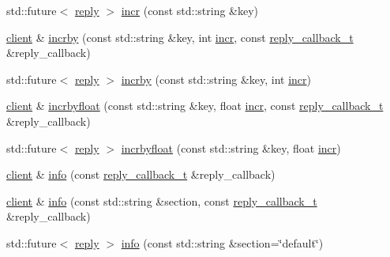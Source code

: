 \begin{DoxyCompactItemize}
\item 
std\+::future$<$ \hyperlink{classcpp__redis_1_1reply}{reply} $>$ \hyperlink{classcpp__redis_1_1client_a36ce71119f98cdc29fb29ca33c8b1ff1}{incr} (const std\+::string \&key)
\item 
\hyperlink{classcpp__redis_1_1client}{client} \& \hyperlink{classcpp__redis_1_1client_a7ee625ebbbfc9fb6f9821b94055e0a5c}{incrby} (const std\+::string \&key, int \hyperlink{classcpp__redis_1_1client_a2f9ba6c7e83451207403096b19da4faa}{incr}, const \hyperlink{classcpp__redis_1_1client_a061a1140d36d2eaeda82b09a0bb3f9f2}{reply\+\_\+callback\+\_\+t} \&reply\+\_\+callback)
\item 
std\+::future$<$ \hyperlink{classcpp__redis_1_1reply}{reply} $>$ \hyperlink{classcpp__redis_1_1client_ab7dbabc00708da38938bb461b195f177}{incrby} (const std\+::string \&key, int \hyperlink{classcpp__redis_1_1client_a2f9ba6c7e83451207403096b19da4faa}{incr})
\item 
\hyperlink{classcpp__redis_1_1client}{client} \& \hyperlink{classcpp__redis_1_1client_a3ae6ca0b7896748a8fe5a450550c422e}{incrbyfloat} (const std\+::string \&key, float \hyperlink{classcpp__redis_1_1client_a2f9ba6c7e83451207403096b19da4faa}{incr}, const \hyperlink{classcpp__redis_1_1client_a061a1140d36d2eaeda82b09a0bb3f9f2}{reply\+\_\+callback\+\_\+t} \&reply\+\_\+callback)
\item 
std\+::future$<$ \hyperlink{classcpp__redis_1_1reply}{reply} $>$ \hyperlink{classcpp__redis_1_1client_a32c78234437f7f02492e3e01dd44bc43}{incrbyfloat} (const std\+::string \&key, float \hyperlink{classcpp__redis_1_1client_a2f9ba6c7e83451207403096b19da4faa}{incr})
\item 
\hyperlink{classcpp__redis_1_1client}{client} \& \hyperlink{classcpp__redis_1_1client_aaa98ba6f8936eaa013ca0df553199f85}{info} (const \hyperlink{classcpp__redis_1_1client_a061a1140d36d2eaeda82b09a0bb3f9f2}{reply\+\_\+callback\+\_\+t} \&reply\+\_\+callback)
\item 
\hyperlink{classcpp__redis_1_1client}{client} \& \hyperlink{classcpp__redis_1_1client_af276159a3938c97e5318dff39a9084ae}{info} (const std\+::string \&section, const \hyperlink{classcpp__redis_1_1client_a061a1140d36d2eaeda82b09a0bb3f9f2}{reply\+\_\+callback\+\_\+t} \&reply\+\_\+callback)
\item 
std\+::future$<$ \hyperlink{classcpp__redis_1_1reply}{reply} $>$ \hyperlink{classcpp__redis_1_1client_aa0186723d51c8b3c92979537e8ad43b9}{info} (const std\+::string \&section=\char`\"{}default\char`\"{})
\item 

\end{DoxyCompactItemize}
